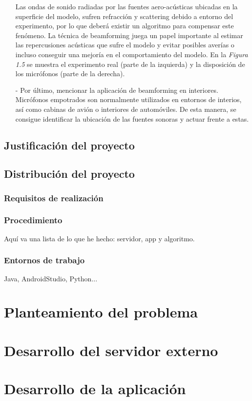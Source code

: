 \documentclass[a4paper,11pt]{book}
\begin{document}
\begin{itemize}
			Las ondas de sonido radiadas por las fuentes aero-acústicas ubicadas en la superficie del modelo, sufren refracción y scattering debido a entorno del experimento, por lo que deberá existir un algoritmo para compensar este fenómeno. La técnica de beamforming juega un papel importante al estimar las repercusiones acústicas que sufre el modelo y evitar posibles averías o incluso conseguir una mejoría en el comportamiento del modelo. En la \textit{Figura 1.5} se muestra el experimento real (parte de la izquierda) y la disposición de los micrófonos (parte de la derecha).
				\item[-] Por último, mencionar la aplicación de beamforming en interiores. Micrófonos empotrados son normalmente utilizados en entornos de interios, así como cabinas de avión o interiores de automóviles. De esta manera, se consigue identificar la ubicación de las fuentes sonoras y actuar frente a estas.
			\end{itemize}
			
	
	\section{Justificación del proyecto}
	\section{Distribución del proyecto}
		\subsection{Requisitos de realización}
		\subsection{Procedimiento}
		Aquí va una lista de lo que he hecho: servidor, app y algoritmo.
		\subsection{Entornos de trabajo}
		Java, AndroidStudio, Python...
\chapter{Planteamiento del problema}

\chapter{Desarrollo del servidor externo}

\chapter{Desarrollo de la aplicación }
\end{document}
